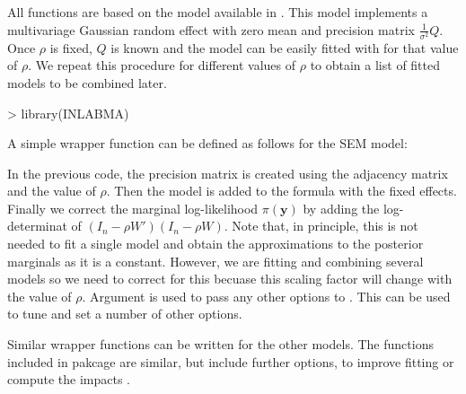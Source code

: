 \documentclass[article]{jss}
\begin{document}
All functions are based on the  model available in  .
This model implements a multivariage Gaussian random effect with zero mean
and precision matrix $\frac{1}{\sigma^2} Q$. Once $\rho$ is fixed, $Q$ is
known and the model can be easily fitted with  for that value of
$\rho$. We repeat this procedure for different values of $\rho$ to
obtain a list of fitted models to be combined later.

\begin{Schunk}
\begin{Sinput}
> library(INLABMA)
\end{Sinput}
\end{Schunk}

A simple wrapper function can be defined as follows for the SEM model:

\begin{Schunk}
\end{Schunk}

In the previous code, the precision matrix is created using the adjacency
matrix and the value of $\rho$. Then the  model is added to the
formula with the fixed effects. Finally we correct the marginal log-likelihood
$\pi(\mathbf{y})$ by adding the log-determinat of $(I_n-\rho W')(I_n-\rho W)$.
Note that, in principle, this is not needed to fit a single model and obtain
the approximations to the posterior marginals as it is a constant. However, we
are fitting and combining several models so we need to correct for this
becuase this scaling factor will change with the value of $\rho$.
Argument  is used to pass any other options to . 
This can be used to tune and set a number of other options.

Similar wrapper functions can be written for the other models. The functions
included in pakcage  are similar, but include further options,
to improve fitting or compute the impacts 
\citep[see,][for details]{Bivandetal:2013}.
\end{document}
